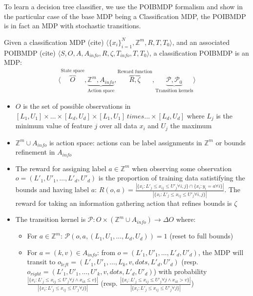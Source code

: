 To learn a decision tree classifier, we use the POIBMDP formalism and show in the particular case of the base MDP being a Classification MDP, the POIBMDP is in fact an MDP with stochastic transitions. 

\begin{definition}
    Given a classification MDP (cite) $\langle {\{x_i\}}_{i=1}^N, \mathbb{Z}^m, R, T, T_0 \rangle$, and an associated POIBMDP (cite) $\langle S, O, A, A_{info}, R, \zeta, T_{info}, T, T_0\rangle$, a classification POIBMDP is an MDP:
    \begin{align*}
        \langle \overbrace{O}^{\text{State space}}, \underbrace{\mathbb{Z}^m, A_{info}}_{\text{Action space}}, \overbrace{R, \zeta}^{\text{Reward function}}, \underbrace{\mathcal{P}, \mathcal{P}_0}_{\text{Transition kernels}} \rangle
    \end{align*}
    \begin{itemize}
        \item $O$ is the set of possible observations in $[L_1, U_1] \times \dots \times [L_d, U_d] \times [L_1, U_1] \ times \dots \times [L_d, U_d] $ where $L_j$ is the minimum value of feature $j$ over all data $x_i$ and $U_j$ the maximum
        \item $\mathbb{Z}^m \cup A_{info}$ is action space: actions can be label assignments in $\mathbb{Z}^m$ or bounds refinement in $A_{info}$
        \item The reward for assigning label $a\in \mathbb{Z}^m$ when observing some observation $o=(L'_1, U'_1, \dots, L'_d, U'_d)$ is the proportion of training data satistifying the bounds and having label $a$: $R(o, a) = \frac{|\{x_i: L'_j \leq x_{ij} \leq U'_j \forall i,j \} \cap \{x_i: y_i = a \forall i \}|}{|\{x_i: L'_j \leq x_{ij} \leq U'_j \forall i,j \}|}$. 
        The reward for taking an information gathering action that refines bounds is $\zeta$
        \item The transition kernel is $\mathcal{P}:O \times (\mathbb{Z}^m \cup A_{info}) \rightarrow \Delta O$ where:
        \begin{itemize}
            \item For $a \in \mathbb{Z}^m$: $\mathcal{P}(o, a, (L_1, U_1, \dots, L_d, U_d)) = 1$ (reset to full bounds)
            \item For $a = (k, v) \in A_{info}$: from $o=(L'_1, U'_1, \dots, L'_d, U'_d)$, the MDP will transit to $o_{left} = (L'_1, U'_1, \dots, L_k, v, dots, L'_d, U'_d)$ (resp. $o_{right} = (L'_1, U'_1, \dots, U'_k, v, dots, L'_d, U'_d)$) with probability $\frac{|\{x_i: L'_j \leq x_{ij} \leq U'_j \forall j \land x_{ik} \leq v\}|}{|\{x_i: L'_j \leq x_{ij} \leq U'_j \forall j\}|}$ (resp. $\frac{|\{x_i: L'_j \leq x_{ij} \leq U'_j \forall j \land x_{ik} > v\}|}{|\{x_i: L'_j \leq x_{ij} \leq U'_j \forall j\}|}$)
        \end{itemize}
    \end{itemize}
\end{definition}
